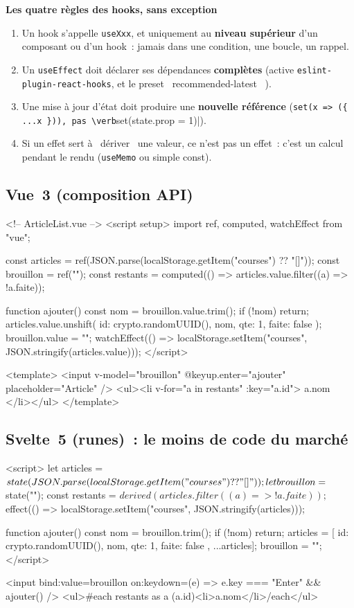 \documentclass[12pt,a4paper,twoside,openright]{book}
\newcommand{\etape}[1]{\par\medskip\noindent\textbf{\large #1}\par\smallskip}
\begin{document}
\etape{Les quatre r\`egles des hooks, sans exception}
\begin{enumerate}
  \item Un hook s'appelle \verb|useXxx|, et uniquement au \textbf{niveau sup\'erieur} d'un
        composant ou d'un hook~: jamais dans une condition, une boucle, un rappel.
  \item Un \verb|useEffect| doit d\'eclarer ses d\'ependances \textbf{compl\`etes}
        (active \verb|eslint-plugin-react-hooks|, et le preset \og ~recommended-latest~ \fg{}).
  \item Une mise \`a jour d'\'etat doit produire une \textbf{nouvelle r\'ef\'erence}
        (\verb|set(x => ({ ...x })), pas \verb|set(state.prop = 1)|).
  \item Si un effet sert \`a \og ~d\'eriver~ \fg{} une valeur, ce n'est pas un effet~: c'est un calcul
        pendant le rendu (\verb|useMemo| ou simple const).
\end{enumerate}

\subsection{Vue~3 (composition API)}

\begin{codeplain}
<!-- ArticleList.vue -->
<script setup>
import { ref, computed, watchEffect } from "vue";

const articles = ref(JSON.parse(localStorage.getItem("courses") ?? "[]"));
const brouillon = ref("");
const restants = computed(() => articles.value.filter((a) => !a.faite));

function ajouter() {
  const nom = brouillon.value.trim();
  if (!nom) return;
  articles.value.unshift({ id: crypto.randomUUID(), nom, qte: 1, faite: false });
  brouillon.value = "";
}
watchEffect(() => localStorage.setItem("courses", JSON.stringify(articles.value)));
</script>

<template>
  <input v-model="brouillon" @keyup.enter="ajouter" placeholder="Article" />
  <ul><li v-for="a in restants" :key="a.id">{{ a.nom }}</li></ul>
</template>
\end{codeplain}

\subsection{Svelte~5 (runes)~: le moins de code du march\'e}

\begin{codeplain}
<script>
  let articles = $state(JSON.parse(localStorage.getItem("courses") ?? "[]"));
  let brouillon = $state("");
  const restants = $derived(articles.filter((a) => !a.faite));
  $effect(() => localStorage.setItem("courses", JSON.stringify(articles)));

  function ajouter() {
    const nom = brouillon.trim();
    if (!nom) return;
    articles = [{ id: crypto.randomUUID(), nom, qte: 1, faite: false }, ...articles];
    brouillon = "";
  }
</script>

<input bind:value={brouillon} on:keydown={(e) => e.key === "Enter" && ajouter()} />
<ul>{#each restants as a (a.id)}<li>{a.nom}</li>{/each}</ul>
\end{codeplain}
\end{document}
